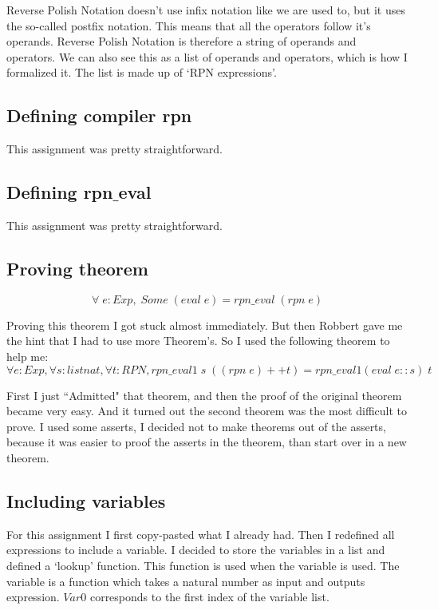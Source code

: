 \documentclass[paper=a4, fontsize=11pt]{scrartcl} %
\numberwithin{equation}{section} %
\numberwithin{figure}{section} %
\numberwithin{table}{section} %
\begin{document}
Reverse Polish Notation doesn't use infix notation like we are used to, but it uses the so-called postfix notation. 
This means that all the operators follow it's operands. 
Reverse Polish Notation is therefore a string of operands and operators. 
We can also see this as a list of operands and operators, which is how I formalized it. 
The list is made up of `RPN expressions'.

\subsection{Defining compiler rpn}

This assignment was pretty straightforward.

\subsection{Defining rpn$\_$eval}

This assignment was pretty straightforward.

\subsection{Proving theorem}

\begin{equation*}
\forall \; e:Exp,\; Some\; (eval\; e) = rpn\_eval\; (rpn\; e)
\end{equation*}

Proving this theorem I got stuck almost immediately. But then Robbert gave me the hint that I had to use more Theorem's.
So I used the following theorem to help me: 
\begin{equation*}
\forall e:Exp, \forall s: list nat, \forall t:RPN, rpn\_eval1\; s\; ((rpn \; e) ++ t) = rpn\_eval1 (eval \; e :: s)\; t
\end{equation*}

First I just ``Admitted" that theorem, and then the proof of the original theorem became very easy.
And it turned out the second theorem was the most difficult to prove.
I used some asserts, I decided not to make theorems out of the asserts, because it was easier to proof the asserts in the theorem, than start over in a new theorem.  


\subsection{Including variables}

For this assignment I first copy-pasted what I already had. Then I redefined all expressions to include a variable.
I decided to store the variables in a list and defined a `lookup' function. This function is used when the variable is used. The variable is a function which takes a natural number as input and outputs expression. $Var 0$ corresponds to the first index of the variable list. 
\end{document}
